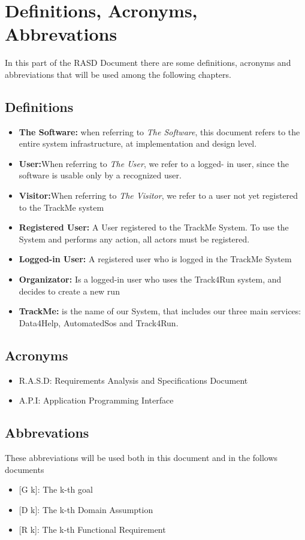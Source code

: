 \section{Definitions, Acronyms, Abbrevations}
In this part of the RASD Document there are some definitions, acronyms and abbreviations that will be used among the following chapters.
\subsection{Definitions}
\begin{itemize}
	\item \textbf{The Software:} when referring to \emph{The Software}, this document refers to the entire system infrastructure, at implementation and design level.

\item \textbf{User:}When referring to \emph{The User}, we refer to a logged- in user, since the software is usable only by a recognized user. 

\item \textbf{Visitor:}When referring to \emph{The Visitor}, we refer to a user not yet registered to the TrackMe system

\item \textbf{Registered User:} A User registered to the TrackMe System. To use the System and performs any action, all actors must be registered. 

\item\textbf{Logged-in User:} A registered user who is logged in the TrackMe System

\item\textbf{Organizator:} Is a logged-in  user who uses the Track4Run system, and decides to create a new run

\item\textbf{TrackMe:}
is the name of our System, that  includes our three main services: Data4Help, AutomatedSos and Track4Run.

	
	\end{itemize}
\subsection{Acronyms}

\begin{itemize}
  \item R.A.S.D: Requirements Analysis and Specifications Document
  \item A.P.I: Application Programming Interface 
\end{itemize}

\subsection{Abbrevations}
These abbreviations will be used both in this document and in the follows documents
\begin{itemize}
	\item {[}G k{]}: The k-th goal
    \item {[}D k{]}: The k-th Domain Assumption
    \item {[}R k{]}: The k-th Functional Requirement
\end{itemize}
